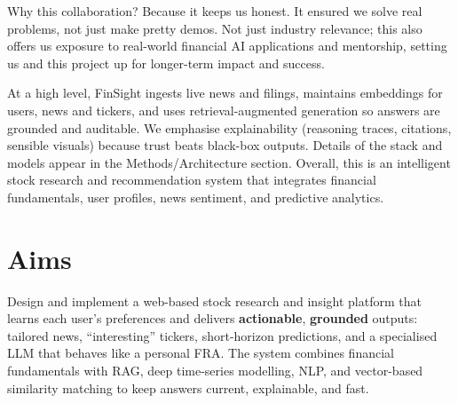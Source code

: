 Why this collaboration? Because it keeps us honest. It ensured we solve real problems, not just make pretty demos. Not just industry relevance; this also offers us exposure to real-world financial AI applications and mentorship, setting us and this project up for longer-term impact and success.

At a high level, FinSight ingests live news and filings, maintains embeddings for users, news and tickers, and uses retrieval-augmented generation so answers are grounded and auditable. We emphasise explainability (reasoning traces, citations, sensible visuals) because trust beats black-box outputs. Details of the stack and models appear in the Methods/Architecture section. Overall, this is an intelligent stock research and recommendation system that integrates financial fundamentals, user profiles, news sentiment, and predictive analytics.



\section{Aims} 
Design and implement a web-based stock research and insight platform that learns each user’s preferences and delivers \textbf{actionable}, \textbf{grounded} outputs: tailored news, “interesting” tickers, short-horizon predictions, and a specialised \acf{LLM} that behaves like a personal \acf{FRA}. The system combines financial fundamentals with \acf{RAG}, deep time-series modelling, \acf{NLP}, and vector-based similarity matching to keep answers current, explainable, and fast.



